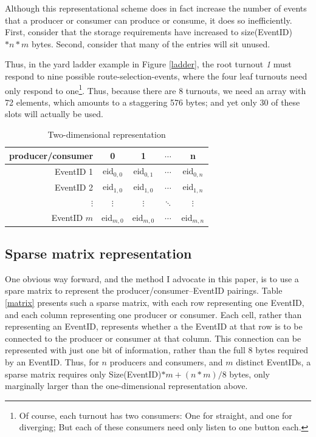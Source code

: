 \documentclass[11pt]{article}
\begin{document}
Although this representational scheme does in fact increase the number of events that a producer or consumer can produce or consume, it does so inefficiently. First, consider that the storage requirements have increased to size(EventID)$*n*m$ bytes. Second, consider that many of the entries will sit unused.

Thus, in the yard ladder example in Figure \ref{ladder}, the root turnout \textit{1} must respond to nine possible route-selection-events, where the four leaf turnouts need only respond to one\footnote{Of course, each turnout has two consumers: One for straight, and one for diverging; But each of these consumers need only listen to one button each.}. Thus, because there are 8 turnouts, we need an array with 72 elements, which amounts to a staggering 576 bytes; and yet only 30 of these slots will actually be used. %

\begin{table}[htdp]
\caption{Two-dimensional representation}
\begin{center}
\begin{tabular}{r|c|c|c|c|}
producer/consumer&0&1&$\cdots$&n \\ \hline
EventID 1&eid$_{0,0}$ & eid$_{0,1}$ & $\cdots$ &eid$_{0,n}$\\
EventID 2&eid$_{1,0}$ & eid$_{1,0}$ & $\cdots$ &eid$_{1,n}$\\
$\vdots$ & $\vdots$ & $\vdots$ & $\ddots$ & $\vdots$\\
EventID $m$ & eid$_{m,0}$ & eid$_{m,0}$ & $\cdots$ &eid$_{m,n}$\\
\end{tabular}
\end{center}
\label{two-dim}
\end{table}%

\subsection{Sparse matrix representation}

One obvious way forward, and the method I advocate in this paper, is to use a spare matrix to represent the producer/consumer--EventID pairings. Table \ref{matrix} presents such a sparse matrix, with each row representing one EventID, and each column representing one producer or consumer. Each cell, rather than representing an EventID, represents whether a the EventID at that row is to be connected to the producer or consumer at that column. This connection can be represented with just one bit of information, rather than the full 8 bytes required by an EventID. Thus, for $n$ producers and consumers, and $m$ distinct EventIDs, a sparse matrix requires only Size(EventID)$*m + (n*m)/8$ bytes, only marginally larger than the one-dimensional representation above.
\end{document}
